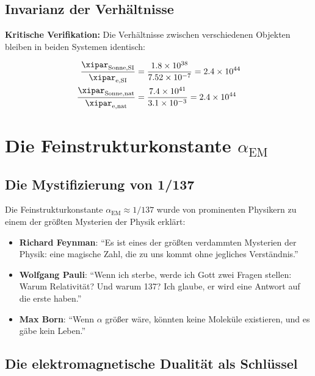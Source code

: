 	\subsection{Invarianz der Verhältnisse}
	\label{subsec:xi_verhaeltnis_invarianz}
	
	\textbf{Kritische Verifikation:} Die Verhältnisse zwischen verschiedenen Objekten bleiben in beiden Systemen identisch:
	
	\begin{align}
		\frac{\xipar_{\text{Sonne},\text{SI}}}{\xipar_{\text{e},\text{SI}}} &= \frac{1.8 \times 10^{38}}{7.52 \times 10^{-7}} = 2.4 \times 10^{44} \\
		\frac{\xipar_{\text{Sonne},\text{nat}}}{\xipar_{\text{e},\text{nat}}} &= \frac{7.4 \times 10^{41}}{3.1 \times 10^{-3}} = 2.4 \times 10^{44}
	\end{align}
	
	
\section{Die Feinstrukturkonstante $\alpha_{\text{EM}}$}
\label{sec:alpha_em}

\subsection{Die Mystifizierung von 1/137}
\label{subsec:alpha_mystification}

Die Feinstrukturkonstante $\alpha_{\text{EM}} \approx 1/137$ wurde von prominenten Physikern zu einem der größten Mysterien der Physik erklärt:

\begin{itemize}
	\item \textbf{Richard Feynman}: ``Es ist eines der größten verdammten Mysterien der Physik: eine magische Zahl, die zu uns kommt ohne jegliches Verständnis.''
	\item \textbf{Wolfgang Pauli}: ``Wenn ich sterbe, werde ich Gott zwei Fragen stellen: Warum Relativität? Und warum 137? Ich glaube, er wird eine Antwort auf die erste haben.''
	\item \textbf{Max Born}: ``Wenn $\alpha$ größer wäre, könnten keine Moleküle existieren, und es gäbe kein Leben.''
\end{itemize}

\subsection{Die elektromagnetische Dualität als Schlüssel}
\label{subsec:electromagnetic_duality}

